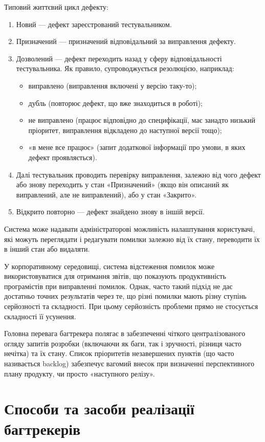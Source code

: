 \documentclass[../main.tex]{subfiles}
\begin{document}
Типовий життєвий цикл дефекту:
\begin{enumerate}
	\item Новий — дефект зареєстрований тестувальником.
	\item Призначений — призначений відповідальний за виправлення дефекту.
	\item Дозволений — дефект переходить назад у сферу відповідальності тестувальника. Як правило, супроводжується резолюцією, наприклад:
	\begin{itemize}
		\item виправлено (виправлення включені у версію таку-то);
		\item дубль (повторює дефект, що вже знаходиться в роботі);
		\item не виправлено (працює відповідно до специфікації, має занадто низький пріоритет, виправлення відкладено до наступної версії тощо);
		\item «в мене все працює» (запит додаткової інформації про умови, в яких дефект проявляється).
	\end{itemize}
	\item Далі тестувальник проводить перевірку виправлення, залежно від чого дефект або знову переходить у стан «Призначений» (якщо він описаний як виправлений, але не виправлений), або у стан «Закрито».
	\item Відкрито повторно — дефект знайдено знову в іншій версії.
\end{enumerate}
Система може надавати адміністраторові можливість налаштування користувачі, які можуть переглядати і редагувати помилки залежно від їх стану, переводити їх в інший стан або видаляти.

У корпоративному середовищі, система відстеження помилок може використовуватися для отримання звітів, що показують продуктивність програмістів при виправленні помилок. Однак, часто такий підхід не дає достатньо точних результатів через те, що різні помилки мають різну ступінь серйозності та складності. При цьому серйозність проблеми прямо не стосується складності її усунення.

Головна перевага багтрекера полягає в забезпеченні чіткого централізованого огляду запитів розробки (включаючи як баги, так і зручності, різниця часто нечітка) та їх стану. Список пріоритетів незавершених пунктів (що часто називається backlog) забезпечує вагомий внесок при визначенні перспективного плану продукту, чи просто «наступного релізу».

\section{Способи та засоби реалізації багтрекерів}
\end{document}
